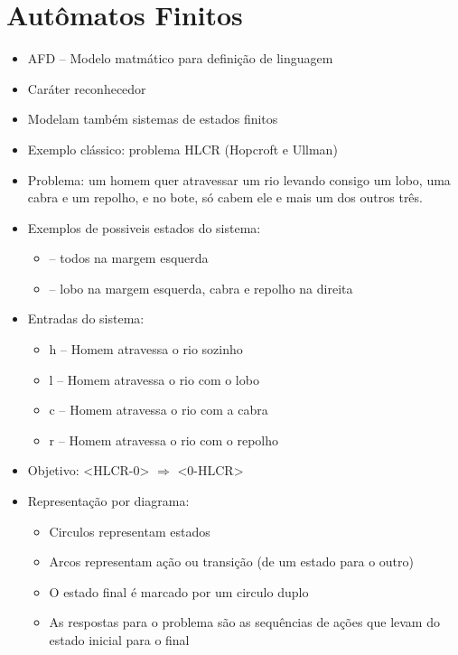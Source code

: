 \documentclass[12pt]{article}
\begin{document}
\section{Autômatos Finitos}
\begin{itemize}
    \item AFD -- Modelo matmático para definição de linguagem
    \item Caráter reconhecedor
    \item Modelam também sistemas de estados finitos
    \item Exemplo clássico: problema HLCR (Hopcroft e Ullman)
    \vspace{32pt}
    \item Problema: um homem quer atravessar um rio levando consigo um lobo, uma 
    cabra e um repolho, e no bote, só cabem ele e mais um dos outros três.
    \item Exemplos de possiveis estados do sistema:
    \begin{itemize}
        \item <HLCR-0> -- todos na margem esquerda
        \item <L-HCR> -- lobo na margem esquerda, cabra e repolho na direita
    \end{itemize}
    \item Entradas do sistema:
    \begin{itemize}
        \item h -- Homem atravessa o rio sozinho
        \item l -- Homem atravessa o rio com o lobo
        \item c -- Homem atravessa o rio com a cabra
        \item r -- Homem atravessa o rio com o repolho
    \end{itemize}
    \item Objetivo: <HLCR-0> $\Rightarrow$ <0-HLCR>
    \item Representação por diagrama:
    \begin{itemize}
        \item Circulos representam estados
        \item Arcos representam ação ou transição (de um estado para o outro)
        \item O estado final é marcado por um circulo duplo
        \item As respostas para o problema são as sequências de ações que 
        levam do estado inicial para o final
    \end{itemize}
\end{itemize}
\end{document}
